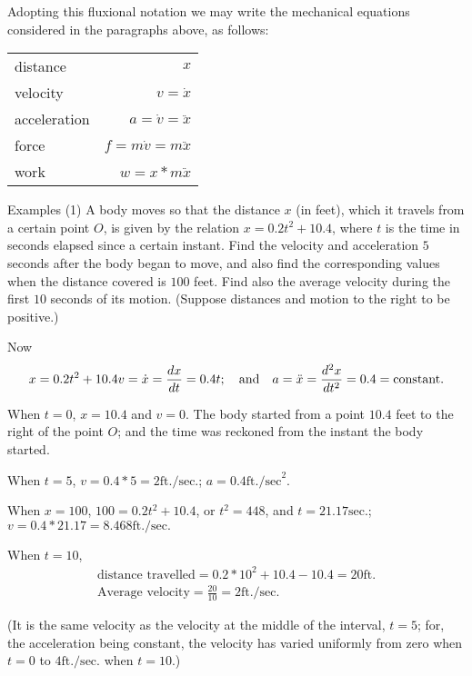\documentclass{ximera}
\begin{document}
Adopting this fluxional notation we may write the
mechanical equations considered in the paragraphs
above, as follows:

\begin{tabular}{ l r }
distance & $x$ \\
velocity & $v = \dot{x}$ \\
acceleration & $a = \dot{v} = \ddot{x}$ \\
force & $f = m\dot{v} = m\ddot{x}$ \\
work & $w = x * m \ddot{x}$ \\
\end{tabular}





Examples
(1) A body moves so that the distance $x$ (in feet),
which it travels from a certain point $O$, is given by
the relation $x = 0.2t^2 + 10.4$, where $t$ is the time in
seconds elapsed since a certain instant. Find the
velocity and acceleration $5$ seconds after the body
began to move, and also find the corresponding values
when the distance covered is $100$ feet. Find also
the average velocity during the first $10$ seconds of
its motion. (Suppose distances and motion to the
right to be positive.)

   Now
   \[
x = 0.2t^2 + 10.4 \\
v = \dot{x}  = \frac{dx}{dt} = 0.4t;\quad\text{and}\quad
a = \ddot{x} = \frac{d^2x}{dt^2} = 0.4 = \text{constant.}
\]

When $t = 0$, $x = 10.4$ and $v = 0$. The body started
from a point $10.4$ feet to the right of the point $O$;
and the time was reckoned from the instant the
body started.

When $t = 5$, $v = 0.4 * 5 = 2 \text{ft./sec.}$; $a = 0.4 \text{ft./sec}^2$.


When $x = 100$, $100 = 0.2t^2 + 10.4$, or $t^2 = 448$,
and $t = 21.17 \text{sec.}$; $v = 0.4 * 21.17 = 8.468 \text{ft./sec.}$

When $t = 10$,
\begin{gather*}
\text{distance travelled} = 0.2 * 10^2 + 10.4 - 10.4 = 20 \text{ft.} \\
\text{Average velocity} = \tfrac{20}{10} = 2 \text{ft./sec.}
\end{gather*}

(It is the same velocity as the velocity at the middle
of the interval, $t = 5$; for, the acceleration being constant,
the velocity has varied uniformly from zero
when $t = 0$ to $4 \text{ft./sec.}$ when $t = 10$.)
\end{document}
